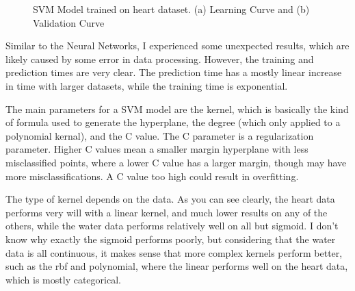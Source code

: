 \documentclass[
	letterpaper, %
]{mlreport}
\begin{document}
\begin{figure}
	\centering
	\caption{SVM Model trained on heart dataset. (a) Learning Curve and (b) Validation Curve}
	\label{fig:fig11}
\end{figure}

Similar to the Neural Networks, I experienced some unexpected results, which are likely caused by some error in data processing. However, the training and prediction times are very clear. The prediction time has a mostly linear increase in time with larger datasets, while the training time is exponential.

The main parameters for a SVM model are the kernel, which is basically the kind of formula used to generate the hyperplane, the degree (which only applied to a polynomial kernal), and the C value. The C parameter is a regularization parameter. Higher C values mean a smaller margin hyperplane with less misclassified points, where a lower C value has a larger margin, though may have more misclassifications. A C value too high could result in overfitting.

The type of kernel depends on the data. As you can see clearly, the heart data performs very will with a linear kernel, and much lower results on any of the others, while the water data performs relatively well on all but sigmoid. I don't know why exactly the sigmoid performs poorly, but considering that the water data is all continuous, it makes sense that more complex kernels perform better, such as the rbf and polynomial, where the linear performs well on the heart data, which is mostly categorical.
\end{document}
